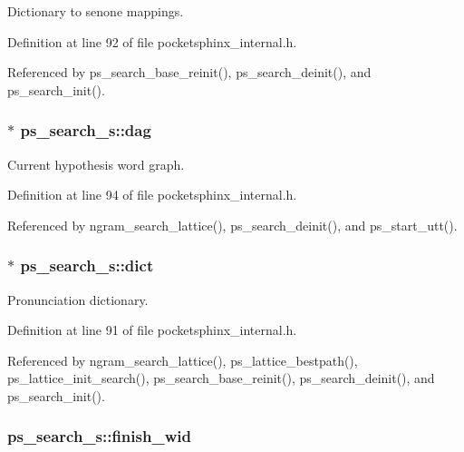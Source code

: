 \-Dictionary to senone mappings. 



\-Definition at line 92 of file pocketsphinx\-\_\-internal.\-h.



\-Referenced by ps\-\_\-search\-\_\-base\-\_\-reinit(), ps\-\_\-search\-\_\-deinit(), and ps\-\_\-search\-\_\-init().

\subsubsection[{dag}]{$\ast$ {\bf ps\-\_\-search\-\_\-s\-::dag}}\label{structps__search__s_a897f46c55d17e817ff1364f555b31463}


\-Current hypothesis word graph. 



\-Definition at line 94 of file pocketsphinx\-\_\-internal.\-h.



\-Referenced by ngram\-\_\-search\-\_\-lattice(), ps\-\_\-search\-\_\-deinit(), and ps\-\_\-start\-\_\-utt().

\subsubsection[{dict}]{$\ast$ {\bf ps\-\_\-search\-\_\-s\-::dict}}\label{structps__search__s_a918f243fa966e72c47f697fb9e60089d}


\-Pronunciation dictionary. 



\-Definition at line 91 of file pocketsphinx\-\_\-internal.\-h.



\-Referenced by ngram\-\_\-search\-\_\-lattice(), ps\-\_\-lattice\-\_\-bestpath(), ps\-\_\-lattice\-\_\-init\-\_\-search(), ps\-\_\-search\-\_\-base\-\_\-reinit(), ps\-\_\-search\-\_\-deinit(), and ps\-\_\-search\-\_\-init().

\subsubsection[{finish\-\_\-wid}]{ {\bf ps\-\_\-search\-\_\-s\-::finish\-\_\-wid}}\label{structps__search__s_a0fb4d79f1084bdbbc0a808513f7c1ca7}


